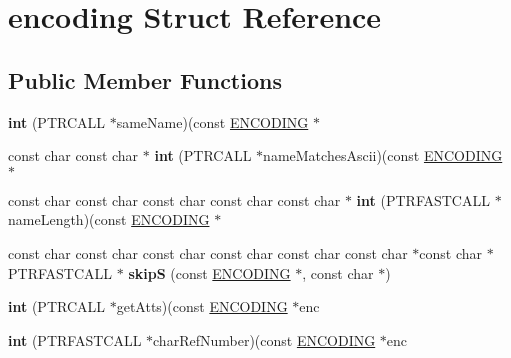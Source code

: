 \hypertarget{structencoding}{}\section{encoding Struct Reference}
\label{structencoding}
\subsection*{Public Member Functions}
\begin{DoxyCompactItemize}
\item 
\mbox{\label{structencoding_a92bcf4f50db1c279fc5eda73472d7202}} 
{\bfseries int} (P\+T\+R\+C\+A\+LL $\ast$same\+Name)(const \mbox{\hyperlink{structencoding}{E\+N\+C\+O\+D\+I\+NG}} $\ast$
\item 
\mbox{\label{structencoding_a77b5f977505072990c8d0a710cc9e1fd}} 
const char const char $\ast$ {\bfseries int} (P\+T\+R\+C\+A\+LL $\ast$name\+Matches\+Ascii)(const \mbox{\hyperlink{structencoding}{E\+N\+C\+O\+D\+I\+NG}} $\ast$
\item 
\mbox{\label{structencoding_a76792dbef2f157c76216dae48d233faf}} 
const char const char const char const char const char $\ast$ {\bfseries int} (P\+T\+R\+F\+A\+S\+T\+C\+A\+LL $\ast$name\+Length)(const \mbox{\hyperlink{structencoding}{E\+N\+C\+O\+D\+I\+NG}} $\ast$
\item 
\mbox{\label{structencoding_a997a21e1c95efd5497d359d43a2d1d17}} 
const char const char const char const char const char const char $\ast$const char $\ast$P\+T\+R\+F\+A\+S\+T\+C\+A\+LL $\ast$ {\bfseries skipS} (const \mbox{\hyperlink{structencoding}{E\+N\+C\+O\+D\+I\+NG}} $\ast$, const char $\ast$)
\item 
\mbox{\label{structencoding_af6bcd2d5f3890fd0e22011c7441435b0}} 
{\bfseries int} (P\+T\+R\+C\+A\+LL $\ast$get\+Atts)(const \mbox{\hyperlink{structencoding}{E\+N\+C\+O\+D\+I\+NG}} $\ast$enc
\item 
\mbox{\label{structencoding_ab4567aa3fa8ce3d60ffacf0d8d90628c}} 
{\bfseries int} (P\+T\+R\+F\+A\+S\+T\+C\+A\+LL $\ast$char\+Ref\+Number)(const \mbox{\hyperlink{structencoding}{E\+N\+C\+O\+D\+I\+NG}} $\ast$enc
\item 

\end{DoxyCompactItemize}
